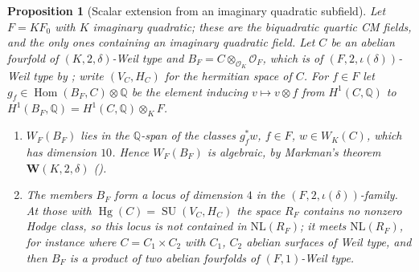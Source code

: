 \documentclass[11pt,reqno]{amsart}
\theoremstyle{plain}
\newtheorem{proposition}[theorem]{Proposition}
\theoremstyle{definition}
\theoremstyle{remark}
\newcommand{\QQ}{\mathbb{Q}}
\newcommand{\cO}{\mathcal{O}}
\DeclareMathOperator{\Hom}{Hom}
\DeclareMathOperator{\Hg}{Hg}
\DeclareMathOperator{\SU}{SU}
\begin{document}
\begin{proposition}[Scalar extension from an imaginary quadratic subfield]
\label{prop:quarticscalar}
Let $F=KF_{0}$ with $K$ imaginary quadratic; these are the biquadratic
quartic CM fields, and the only ones containing an imaginary quadratic field.
Let $C$ be an abelian fourfold of $(K,2,\delta)$-Weil type and
$B_{F}=C\otimes_{\cO_{K}}\cO_{F}$, which is of $(F,2,\iota(\delta))$-Weil type by
\cite[Proposition~2.13(ii)]{paperIII}; write $(V_{C},H_{C})$ for the hermitian space of $C$.
For $f\in F$ let $g_{f}\in\Hom(B_{F},C)\otimes\QQ$ be the element inducing
$v\mapsto v\otimes f$ from $H^{1}(C,\QQ)$ to
$H^{1}(B_{F},\QQ)=H^{1}(C,\QQ)\otimes_{K}F$.
\begin{enumerate}[label=\textup{(\roman*)},leftmargin=2.6em,itemsep=2pt]
\item $W_{F}(B_{F})$ lies in the $\QQ$-span of the classes $g_{f}^{*}w$, $f\in F$,
  $w\in W_{K}(C)$, which has dimension $10$. Hence $W_{F}(B_{F})$ is
  algebraic, by Markman's theorem $\mathbf{W}(K,2,\delta)$ \cite{Mar25a}
  (\cite[Proposition~2.12(ii)]{paperIII}).
\item The members $B_{F}$ form a locus of dimension $4$ in the
  $(F,2,\iota(\delta))$-family. At those with $\Hg(C)=\SU(V_{C},H_{C})$ the
  space $R_{F}$ contains no nonzero Hodge class, so
  this locus is not contained in $\mathrm{NL}(R_{F})$; it meets
  $\mathrm{NL}(R_{F})$, for instance where $C=C_{1}\times C_{2}$ with $C_{1}$,
  $C_{2}$ abelian surfaces of Weil type, and then $B_{F}$ is a product of two
  abelian fourfolds of $(F,1)$-Weil type.
\end{enumerate}
\end{proposition}
\end{document}
